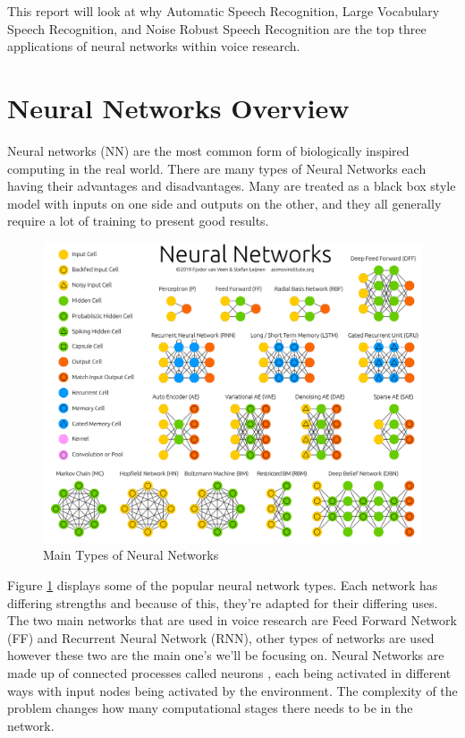\documentclass[11pt]{article}
\begin{document}
    This report will look at why Automatic Speech Recognition, Large Vocabulary Speech Recognition, and Noise Robust Speech Recognition are the top three applications of neural networks within voice research.
    
    \section{Neural Networks Overview}
    Neural networks (NN) are the most common form of biologically inspired computing in the real world. There are many types of Neural Networks each having their advantages and disadvantages. Many are treated as a black box style model with inputs on one side and outputs on the other, and they all generally require a lot of training to present good results.
    
    \begin{figure}[ht]
        \centering
        \includegraphics[scale=0.1]{NeuralNetwork.png}
        \caption{Main Types of Neural Networks \cite{Leijnen2020TheZoo}}
        \label{fig:neuralNetworks}
    \end{figure}
    
    Figure \ref{fig:neuralNetworks} displays some of the popular neural network types. Each network has differing strengths and because of this, they're adapted for their differing uses. The two main networks that are used in voice research are Feed Forward Network (FF) and Recurrent Neural Network (RNN), other types of networks are used however these two are the main one's we'll be focusing on. Neural Networks are made up of connected processes called neurons \cite{Schmidhuber2015DeepOverview}, each being activated in different ways with input nodes being activated by the environment. The complexity of the problem changes how many computational stages there needs to be in the network.
    
\end{document}
